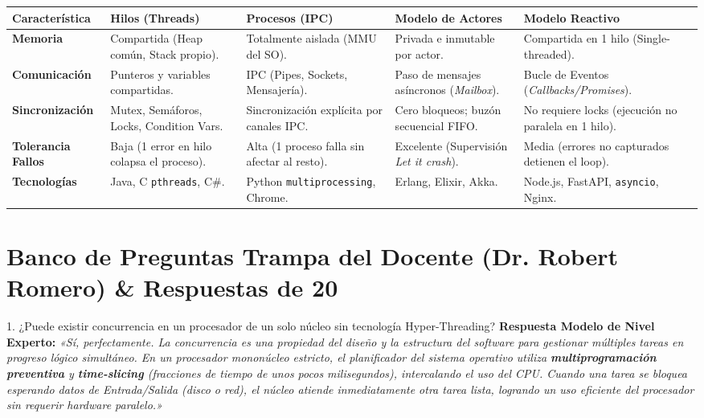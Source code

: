 \documentclass[11pt,a4paper]{article}
\begin{document}
\begin{table}[h!]
\centering
\small
\begin{tabular}{@{}lp{3.2cm}p{3.2cm}p{3.2cm}p{3.2cm}@{}}
\toprule
\textbf{Característica} & \textbf{Hilos (Threads)} & \textbf{Procesos (IPC)} & \textbf{Modelo de Actores} & \textbf{Modelo Reactivo} \\ \midrule
\textbf{Memoria} & Compartida (Heap común, Stack propio). & Totalmente aislada (MMU del SO). & Privada e inmutable por actor. & Compartida en 1 hilo (Single-threaded). \\
\textbf{Comunicación} & Punteros y variables compartidas. & IPC (Pipes, Sockets, Mensajería). & Paso de mensajes asíncronos (\textit{Mailbox}). & Bucle de Eventos (\textit{Callbacks/Promises}). \\
\textbf{Sincronización} & Mutex, Semáforos, Locks, Condition Vars. & Sincronización explícita por canales IPC. & Cero bloqueos; buzón secuencial FIFO. & No requiere locks (ejecución no paralela en 1 hilo). \\
\textbf{Tolerancia Fallos} & Baja (1 error en hilo colapsa el proceso). & Alta (1 proceso falla sin afectar al resto). & Excelente (Supervisión \textit{Let it crash}). & Media (errores no capturados detienen el loop). \\
\textbf{Tecnologías} & Java, C \texttt{pthreads}, C\#. & Python \texttt{multiprocessing}, Chrome. & Erlang, Elixir, Akka. & Node.js, FastAPI, \texttt{asyncio}, Nginx. \\ \bottomrule
\end{tabular}
\end{table}

\section{Banco de Preguntas Trampa del Docente (Dr. Robert Romero) \& Respuestas de 20}

\begin{qabox}{1. ¿Puede existir concurrencia en un procesador de un solo núcleo sin tecnología Hyper-Threading?}
\textbf{Respuesta Modelo de Nivel Experto:}  
\textit{«Sí, perfectamente. La concurrencia es una propiedad del diseño y la estructura del software para gestionar múltiples tareas en progreso lógico simultáneo. En un procesador mononúcleo estricto, el planificador del sistema operativo utiliza \textbf{multiprogramación preventiva} y \textbf{time-slicing} (fracciones de tiempo de unos pocos milisegundos), intercalando el uso del CPU. Cuando una tarea se bloquea esperando datos de Entrada/Salida (disco o red), el núcleo atiende inmediatamente otra tarea lista, logrando un uso eficiente del procesador sin requerir hardware paralelo.»}
\end{qabox}
\end{document}
